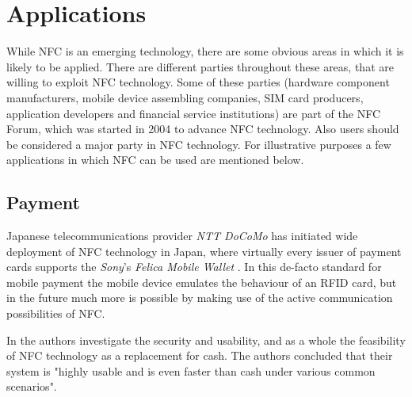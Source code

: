 \section{Applications}
While NFC is an emerging technology, there are some obvious areas in which it is likely to be applied. There are different parties throughout these areas, that are willing to exploit NFC technology. Some of these parties (hardware component manufacturers, mobile device assembling companies, SIM card producers, application developers and financial service institutions) are part of the NFC Forum, which was started in 2004 to advance NFC technology. Also users should be considered a major party in NFC technology.
For illustrative purposes a few applications in which NFC can be used are mentioned below.

\subsection{Payment}
Japanese telecommunications provider \textit{NTT DoCoMo} has initiated wide deployment of NFC technology in Japan, where virtually every issuer of payment cards supports the \textit{Sony}'s \textit{Felica Mobile Wallet} \cite{3g_japan}.
In this de-facto standard for mobile payment the mobile device emulates the behaviour of an RFID card, but in the future much more is possible by making use of the active communication possibilities of NFC. %


In \cite{1555846} the authors investigate the security and usability, and as a whole the feasibility of NFC technology as a replacement for cash.
The authors concluded that their system is "highly usable and is even faster than cash under various common scenarios".


